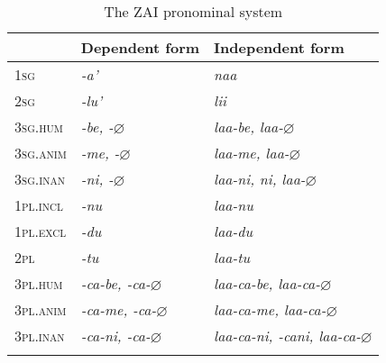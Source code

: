  \begin{table}
 \caption{The ZAI pronominal system}

\begin{tabular}{ l ll }
\lsptoprule
 & Dependent form & Independent form \\

\midrule
1\textsc{sg} & \emph{-a'} & \emph{naa} \\

 
2\textsc{sg} & \emph{-lu'} & \emph{lii} \\

 
3\textsc{sg.hum} & \emph{-be, -$\varnothing$} & \emph{laa-be, laa-$\varnothing$} \\

 
3\textsc{sg.anim} & \emph{-me, -$\varnothing$} & \emph{laa-me, laa-$\varnothing$} \\

 
3\textsc{sg.inan} &  \emph{-ni, -$\varnothing$} & \emph{laa-ni, ni, laa-$\varnothing$} \\

 
1\textsc{pl.incl} & \emph{-nu} & \emph {laa-nu} \\

 
1\textsc{pl.excl} & \emph{-du} & \emph {laa-du} \\

 
2\textsc{pl} & \emph{-tu} & \emph {laa-tu} \\

 
3\textsc{pl.hum} &  \emph{-ca-be, -ca-$\varnothing$} & \emph {laa-ca-be, laa-ca-$\varnothing$} \\

 
3\textsc{pl.anim} &\emph{-ca-me, -ca-$\varnothing$} & \emph{laa-ca-me, laa-ca-$\varnothing$} \\

 
3\textsc{pl.inan} &  \emph{-ca-ni, -ca-$\varnothing$} & \emph{laa-ca-ni, -cani, laa-ca-$\varnothing$} \\

\lspbottomrule
\end{tabular} 
 \label{izpronounstable}
 \end{table}

